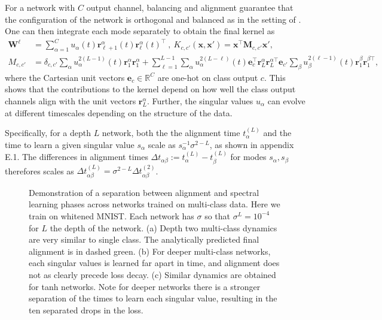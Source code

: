 \documentclass{article} %
\def\x{\bm x}
\begin{document}
\begin{appendix}
For a network with $C$ output channel, balancing and alignment guarantee that the configuration of the network is orthogonal and balanced as in the setting of \cite{Saxe14exactsolutions}. One can then integrate each mode separately to obtain the final kernel as
\begin{equation}
\begin{aligned}
    \bm W^{\ell} &=  \sum_{\alpha=1}^C u_{\alpha}(t) \bm r_{\ell+1}^{\alpha}(t) \bm r_{\ell}^{\alpha}(t)^\top \ , \ K_{c,c'}(\x,\x') = \x^\top \bm M_{c,c'} \x',
    \\
    M_{c,c'} &= \delta_{c,c'} \sum_{\alpha} u_{\alpha}^{2(L-1)}(t) \bm r_1^{\alpha} \bm r_1^{\alpha}  +  \sum_{\ell=1}^{L-1} \sum_{\alpha} u_{\alpha}^{2(L-\ell)}(t) \bm e_c^\top \bm r_L^{\alpha} \bm r_L^{\alpha \top} \bm e_{c'}  \sum_{\beta} u_{\beta}^{2(\ell-1)}(t) \bm r_1^{\beta} \bm r_1^{\beta \top},
\end{aligned}
\end{equation}
where the Cartesian unit vectors $\bm e_c \in \mathbb{R}^{C}$ are one-hot on class output $c$. This shows that the contributions to the kernel depend on how well the class output channels align with the unit vectors $\bm r_L^{\alpha}$. Further, the singular values $u_{\alpha}$ can evolve at different timescales depending on the structure of the data. 

Specifically, for a depth $L$ network, both the the alignment time $t_\alpha^{(L)}$ and the time to learn a given singular value $s_\alpha$ scale as $s_\alpha^{-1} \sigma^{2-L}$, as shown in appendix E.1. The differences in alignment times $\Delta t_{\alpha \beta} := t_{\alpha}^{(L)} - t_{\beta}^{(L)}$ for modes $s_\alpha, s_\beta$ therefores scales as $\Delta t_{\alpha \beta}^{(L)} = \sigma^{2-L} \Delta t_{\alpha \beta}^{(2)}$.

\begin{figure}[ht]
    \centering
    
    \caption{Demonstration of a separation between alignment and spectral learning phases across networks trained on multi-class data. Here we train on whitened MNIST. Each network has $\sigma$ so that $\sigma^L = 10^{-4}$ for $L$ the depth of the network. (a) Depth two multi-class dynamics are very similar to single class. The analytically predicted final alignment is in dashed green. (b) For deeper multi-class networks, each singular values is learned far apart in time, and alignment does not as clearly precede loss decay.  (c) Similar dynamics are obtained for tanh networks. Note for deeper networks there is a stronger separation of the times to learn each singular value, resulting in the ten separated drops in the loss.}
    \label{fig:multi-class}
\end{figure}




\end{appendix}
\end{document}
